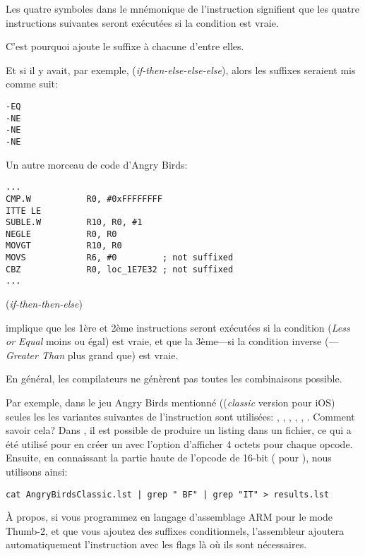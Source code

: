 Les quatre symboles  dans le mnémonique de l'instruction signifient que les quatre
instructions suivantes seront exécutées si la condition est vraie.

C'est pourquoi \IDA ajoute le suffixe  à chacune d'entre elles.

Et si il y avait, par exemple,  (\emph{if-then-else-else-else}),
alors les suffixes seraient mis comme suit:

\begin{lstlisting}
-EQ
-NE
-NE
-NE
\end{lstlisting}

Un autre morceau de code d'Angry Birds:

\begin{lstlisting}[caption=Angry Birds Classic,style=customasmARM]
...
CMP.W           R0, #0xFFFFFFFF
ITTE LE
SUBLE.W         R10, R0, #1
NEGLE           R0, R0
MOVGT           R10, R0
MOVS            R6, #0         ; not suffixed
CBZ             R0, loc_1E7E32 ; not suffixed
...
\end{lstlisting}

 (\emph{if-then-then-else})

implique que les 1ère et 2ème instructions seront exécutées si la condition 
(\emph{Less or Equal} moins ou égal) est vraie, et que la 3ème---si la condition inverse
(---\emph{Greater Than} plus grand que) est vraie.

En général, les compilateurs ne génèrent pas toutes les combinaisons possible.

Par exemple, dans le jeu Angry Birds mentionné ((\emph{classic} version pour iOS)
seules les les variantes suivantes de l'instruction  sont utilisées:
, , , , , .
\myindex{\GrepUsage}
Comment savoir cela?
Dans \IDA, il est possible de produire un listing dans un fichier, ce qui a été utilisé
pour en créer un avec l'option d'afficher 4 octets pour chaque opcode.
Ensuite, en connaissant la partie haute de l'opcode de 16-bit ( pour ),
nous utilisons  ainsi:

\begin{lstlisting}
cat AngryBirdsClassic.lst | grep " BF" | grep "IT" > results.lst
\end{lstlisting}


À propos, si vous programmez en langage d'assemblage ARM pour le mode Thumb-2, et
que vous ajoutez des suffixes conditionnels, l'assembleur ajoutera automatiquement
l'instruction  avec les flags là où ils sont nécessaires.

